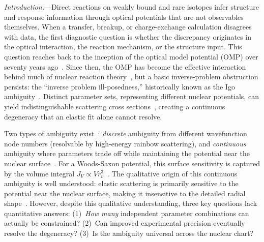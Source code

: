 \documentclass[aps,prl,reprint,superscriptaddress,showpacs,floatfix]{revtex4-2}
\begin{document}
\textit{Introduction.}---Direct reactions on weakly bound and rare isotopes infer structure and response information through optical potentials that are not observables themselves. When a transfer, breakup, or charge-exchange calculation disagrees with data, the first diagnostic question is whether the discrepancy originates in the optical interaction, the reaction mechanism, or the structure input. This question reaches back to the inception of the optical model potential (OMP) over seventy years ago~\cite{Feshbach1954,Feshbach1958,Feshbach1962}. Since then, the OMP has become the effective interaction behind much of nuclear reaction theory~\cite{Hodgson1971,Satchler1983,Mahaux1991,Dickhoff2019}, but a basic inverse-problem obstruction persists: the ``inverse problem ill-posedness,'' historically known as the Igo ambiguity~\cite{Igo1958}. Distinct parameter sets, representing different nuclear potentials, can yield indistinguishable scattering cross sections~\cite{Perey1976,Greenlees1968}, creating a continuous degeneracy that an elastic fit alone cannot resolve.

Two types of ambiguity exist~\cite{Satchler1983}: \emph{discrete} ambiguity from different wavefunction node numbers (resolvable by high-energy rainbow scattering), and \emph{continuous} ambiguity where parameters trade off while maintaining the potential near the nuclear surface~\cite{Greenlees1968}. For a Woods-Saxon potential, this surface sensitivity is captured by the volume integral $J_V \propto V r_v^3$~\cite{Satchler1983}. The qualitative origin of this continuous ambiguity is well understood: elastic scattering is primarily sensitive to the potential near the nuclear surface, making it insensitive to the detailed radial shape~\cite{Satchler1983}. However, despite this qualitative understanding, three key questions lack quantitative answers: (1)~\emph{How many} independent parameter combinations can actually be constrained? (2)~Can improved experimental precision eventually resolve the degeneracy? (3)~Is the ambiguity universal across the nuclear chart?
\end{document}
